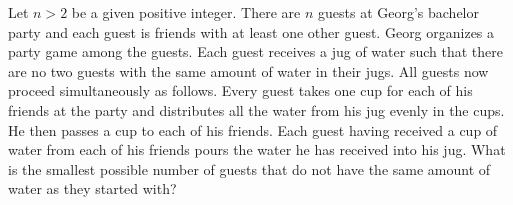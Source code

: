 Let $n>2$ be a given positive integer. There are $n$ guests at Georg's bachelor party and each guest is friends with at least one other guest. Georg organizes a party game among the guests. Each guest receives a jug of water such that there are no two guests with the same amount of water in their jugs. All guests now proceed simultaneously as follows. Every guest takes one cup for each of his friends at the party and distributes all the water from his jug evenly in the cups. He then passes a cup to each of his friends. Each guest having received a cup of water from each of his friends pours the water he has received into his jug. What is the smallest possible number of guests that do not have the same amount of water as they started with?